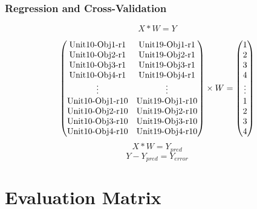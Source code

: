 \documentclass{beamer}
\begin{document}
\begin{frame}
\frametitle{Regression and Cross-Validation }
\begin{center}


\begin{equation}\label{eq:linearReg}
    X*W=Y
\end{equation}


\begin{equation}\label{eq:multiUnit}
\begin{pmatrix}
 $Unit10-Obj1-r1$ & $Unit19-Obj1-r1$ \\ 
$Unit10-Obj2-r1$ & $Unit19-Obj2-r1$\\ 
$Unit10-Obj3-r1$ & $Unit19-Obj3-r1$\\ 
$Unit10-Obj4-r1$ & $Unit19-Obj4-r1$\\ 
  \vdots &\vdots\\ 
$Unit10-Obj1-r10$ & $Unit19-Obj1-r10$ \\ 
$Unit10-Obj2-r10$ & $Unit19-Obj2-r10$\\ 
$Unit10-Obj3-r10$ & $Unit19-Obj3-r10$\\ 
$Unit10-Obj4-r10$ & $Unit19-Obj4-r10$\\ 

\end{pmatrix}
\times
W
=
\begin{pmatrix}
 1\\ 
2\\ 
3\\ 
4\\ 
  \vdots\\ 

 1\\ 
2\\ 
3\\ 
4\\ 
\end{pmatrix}
\end{equation}
\begin{equation}\label{eq:predOut}
         X*W=Y_{pred}
\end{equation}
\begin{equation}\label{eq:predErr}
         Y-Y_{pred}=Y_{error}
\end{equation}

\end{center}
\end{frame}

\section{Evaluation Matrix}
\end{document}
